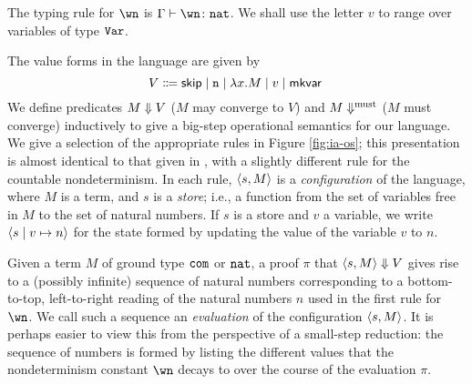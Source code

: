 \documentclass[sigplan,10pt,review]{acmart}\settopmatter{printfolios=true,printccs=false,printacmref=false}
\begin{document}
The typing rule for $\wn$ is $\Gamma \vdash \wn\from\nat$.
We shall use the letter $v$ to range over variables of type ${\mathtt{Var}}$.  

The value forms in the language are given by
\[
  V \Coloneqq {\mathsf{skip}} \mid {\mathtt{n}} \mid \lambda x.M \mid v \mid {\mathsf{mkvar}\;}
  \]
We define predicates $M \Downarrow V$ ($M$ may converge to $V$) and $M\Downarrow^{\text{must}}$ ($M$ must converge) inductively to give a big-step operational semantics for our language.  
We give a selection of the appropriate rules in Figure \ref{fig:ia-os}; this presentation is almost identical to that given in \cite{mcCHFiniteND}, with a slightly different rule for the countable nondeterminism.  
In each rule, $\langle s , M \rangle$ is a \emph{configuration} of the language, where $M$ is a term, and $s$ is a \emph{store}; i.e., a function from the set of variables free in $M$ to the set of natural numbers.  
If $s$ is a store and $v$ a variable, we write $\langle s \mid v \mapsto n \rangle$ for the state formed by updating the value of the variable $v$ to $n$.

\begin{figure*}
  \caption{Operational semantics of Idealized Algol with Countable Nondeterminism}
  \label{fig:ia-os}
\end{figure*}

Given a term $M$ of ground type ${\mathtt{com}}$ or ${\mathtt{nat}}$, a proof $\pi$ that $\langle s , M \rangle\Downarrow V$ gives rise to a (possibly infinite) sequence of natural numbers corresponding to a bottom-to-top, left-to-right reading of the natural numbers $n$ used in the first rule for $\wn$.  
We call such a sequence an \emph{evaluation} of the configuration $\langle s , M \rangle$.  
It is perhaps easier to view this from the perspective of a small-step reduction: the sequence of numbers is formed by listing the different values that the nondeterminism constant $\wn$ decays to over the course of the evaluation $\pi$.  
\end{document}
